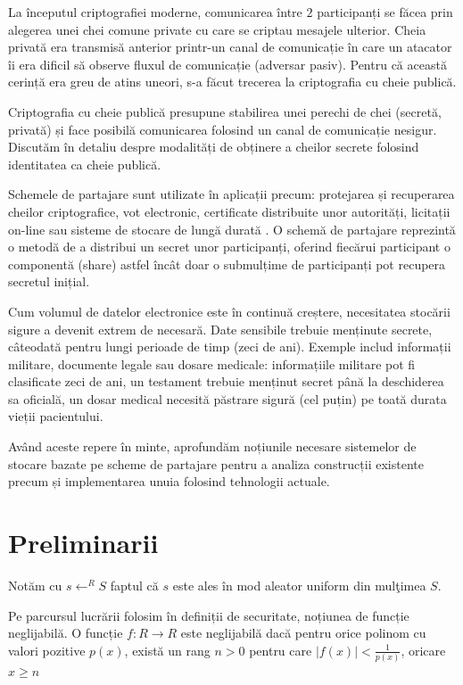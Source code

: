 \documentclass[oneside, 12pt]{book}
\begin{document}
La începutul criptografiei moderne, comunicarea între $2$ participanți se făcea prin alegerea unei chei comune private cu care se criptau mesajele ulterior. Cheia privată era transmisă anterior printr-un canal de comunicație în care un atacator îi era dificil să observe fluxul de comunicație (adversar pasiv). Pentru că această cerință era greu de atins uneori, s-a făcut trecerea la criptografia cu cheie publică.

Criptografia cu cheie publică presupune stabilirea unei perechi de chei (secretă, privată) și face posibilă comunicarea folosind un canal de comunicație nesigur. Discutăm în detaliu despre modalități de obținere a cheilor secrete folosind identitatea ca cheie publică.

Schemele de partajare sunt utilizate în aplicații precum: protejarea și recuperarea cheilor criptografice, vot electronic, certificate distribuite unor autorități, licitații on-line sau sisteme de stocare de lungă durată \cite{Martin:2008}. O schemă de partajare reprezintă o metodă de a distribui un secret unor participanți, oferind fiecărui participant o componentă (share) astfel încât doar o submulțime de participanți pot recupera secretul inițial.

Cum volumul de datelor electronice este în continuă creștere, necesitatea stocării sigure a devenit extrem de necesară. Date sensibile trebuie menținute secrete, câteodată pentru lungi perioade de timp (zeci de ani). Exemple includ informații militare, documente legale sau dosare medicale: informațiile militare pot fi clasificate zeci de ani, un testament trebuie menținut secret până la deschiderea sa oficială, un dosar medical necesită păstrare sigură (cel puțin) pe toată durata vieții pacientului.

Având aceste repere în minte, aprofundăm noțiunile necesare sistemelor de stocare bazate pe scheme de partajare pentru a analiza construcții existente precum și implementarea unuia folosind tehnologii actuale.


\section*{Preliminarii}

Notăm cu $s \leftarrow^R S$ faptul că $s$ este ales în mod aleator uniform din mulţimea $S$. 

Pe parcursul lucrării folosim în definiții de securitate, noțiunea de funcție neglijabilă. O funcție $f : R \rightarrow R$ este neglijabilă dacă pentru orice polinom cu valori pozitive $p(x)$, există un rang $n > 0$ pentru care $|f(x)| < \frac{1}{p(x)}$, oricare $x \geq n$
\end{document}
